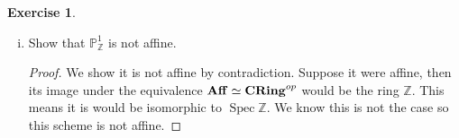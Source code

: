 \documentclass{article}
\newcommand{\Z}{\mathbb{Z}}
\newcommand{\proj}{\mathbb{P}}
\newcommand{\aff}{{\bf Aff}}
\newcommand{\cring}{{\bf CRing}}
\DeclareMathOperator{\spec}{Spec}
\theoremstyle{definition}
\newtheorem{question}{Exercise}
\begin{document}
\begin{question}
\begin{enumerate}[(i)]
        \item Show that \(\proj_{\Z}^{1}\) is not affine.

              \begin{proof}
                  We show it is not affine by contradiction. Suppose it were
                  affine, then its image under the equivalence
                  \(\aff\simeq\cring^{op}\) would be the ring \(\Z\). This means
                  it is would be isomorphic to \(\spec\Z\). We know this is not
                  the case so this scheme is not affine.
              \end{proof}
    \end{enumerate}
\end{question}
\end{document}
